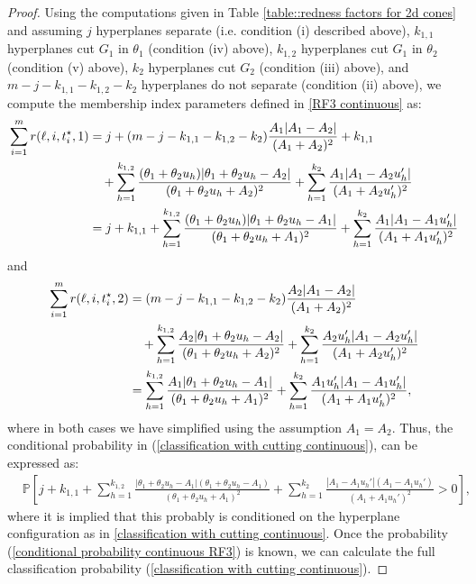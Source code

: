\documentclass[twoside,11pt]{article}
\begin{document}
\begin{proof}
Using the computations given in Table \ref{table::redness factors for 2d cones} and assuming $j$ hyperplanes separate (i.e. condition (i) described above), $k_{1,1}$ hyperplanes cut $G_1$ in $\theta_1$ (condition (iv) above), $k_{1,2}$ hyperplanes cut $G_1$ in $\theta_2$ (condition (v) above),  $k_2$ hyperplanes cut $G_2$ (condition (iii) above), and $m-j-k_{1,1}-k_{1,2}-k_2$ hyperplanes do not separate (condition (ii) above), we compute the membership index parameters defined in \eqref{RF3 continuous} as: 
\begin{align}\label{compRF1}
\sum_{i=1}^m r(\ell,i,t_i^\star,1) &= j + (m-j-k_{1,1}-k_{1,2}-k_2)\frac{A_1|A_1-A_2|}{(A_1+A_2)^2} + k_{1,1} \notag \\
&\quad + \sum_{h=1}^{k_{1,2}}\frac{(\theta_1+\theta_2 u_h)|\theta_1+\theta_2 u_h-A_2|}{(\theta_1+\theta_2 u_h+A_2)^2} + \sum_{h=1}^{k_2}\frac{A_1|A_1-A_2 u_h'|}{(A_1+A_2 u_h')^2} \notag\\
&=  j + k_{1,1} 
 + \sum_{h=1}^{k_{1,2}}\frac{(\theta_1+\theta_2 u_h)|\theta_1+\theta_2 u_h-A_1|}{(\theta_1+\theta_2 u_h+A_1)^2} + \sum_{h=1}^{k_2}\frac{A_1|A_1-A_1 u_h'|}{(A_1+A_1 u_h')^2}
\end{align}
and
\begin{align}\label{compRF2}
\sum_{i=1}^m r(\ell,i,t_i^\star,2) &=  (m-j-k_{1,1}-k_{1,2}-k_2)\frac{A_2|A_1-A_2|}{(A_1+A_2)^2}  \notag \\
&\quad + \sum_{h=1}^{k_{1,2}}\frac{A_2|\theta_1+\theta_2 u_h-A_2|}{(\theta_1+\theta_2 u_h+A_2)^2} + \sum_{h=1}^{k_2}\frac{A_2 u_h'|A_1-A_2 u_h'|}{(A_1+A_2 u_h')^2}\notag\\
&=  \sum_{h=1}^{k_{1,2}}\frac{A_1|\theta_1+\theta_2 u_h-A_1|}{(\theta_1+\theta_2 u_h+A_1)^2} + \sum_{h=1}^{k_2}\frac{A_1 u_h'|A_1-A_1 u_h'|}{(A_1+A_1 u_h')^2},
\end{align}
where in both cases we have simplified using the assumption $A_1 = A_2$.
Thus, the conditional probability in (\ref{classification with cutting continuous}), can be expressed as:
\begin{align}
&\mathbb{P}\left[j + k_{1,1} + \sum_{h=1}^{k_{1,2}}\frac{|\theta_1+\theta_2 u_h-A_1|(\theta_1+\theta_2 u_h-A_1)}{(\theta_1+\theta_2 u_h+A_1)^2} + \sum_{h=1}^{k_2}\frac{|A_1-A_1 u_h'|(A_1-A_1 u_h')}{(A_1+A_1 u_h')^2} > 0\right] \label{conditional probability continuous RF3},
\end{align}
where it is implied that this probably is conditioned on the hyperplane configuration as in \eqref{classification with cutting continuous}.
Once the probability (\ref{conditional probability continuous RF3}) is known, we can calculate the full classification probability (\ref{classification with cutting continuous}).


\end{proof}
\end{document}
